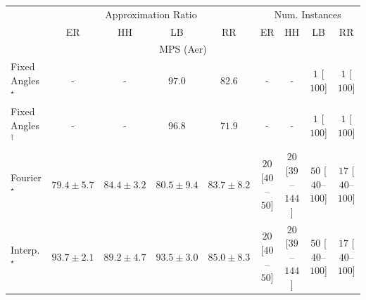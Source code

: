 \begin{tabular}{l|cccc|cccc|}
\toprule
& \multicolumn{4}{c|}{Approximation Ratio} & \multicolumn{4}{c|}{Num. Instances} \\
            & ER & HH & LB & RR & ER & HH & LB & RR \\
\midrule
\multicolumn{9}{c}{\rule{0pt}{8pt}MPS (Aer)} \\
\midrule
Fixed Angles$^\star$ & {\cellcolor[HTML]{000000}} \color[HTML]{F1F1F1} {\cellcolor{white}} \color{black} - & {\cellcolor[HTML]{000000}} \color[HTML]{F1F1F1} {\cellcolor{white}} \color{black} - & {\cellcolor[HTML]{50014E}} \color[HTML]{F1F1F1} $97.0$ & {\cellcolor[HTML]{8B5CAA}} \color[HTML]{F1F1F1} $82.6$ & {\cellcolor[HTML]{000000}} \color[HTML]{F1F1F1} {\cellcolor{white}} \color{black} - & {\cellcolor[HTML]{000000}} \color[HTML]{F1F1F1} {\cellcolor{white}} \color{black} - & {\cellcolor[HTML]{FFF7F3}} \color[HTML]{000000} $1$ [$100$] & {\cellcolor[HTML]{FFF7F3}} \color[HTML]{000000} $1$ [$100$] \\
Fixed Angles$^\dagger$ & {\cellcolor[HTML]{000000}} \color[HTML]{F1F1F1} {\cellcolor{white}} \color{black} - & {\cellcolor[HTML]{000000}} \color[HTML]{F1F1F1} {\cellcolor{white}} \color{black} - & {\cellcolor[HTML]{520150}} \color[HTML]{F1F1F1} $96.8$ & {\cellcolor[HTML]{95AAD0}} \color[HTML]{F1F1F1} $71.9$ & {\cellcolor[HTML]{000000}} \color[HTML]{F1F1F1} {\cellcolor{white}} \color{black} - & {\cellcolor[HTML]{000000}} \color[HTML]{F1F1F1} {\cellcolor{white}} \color{black} - & {\cellcolor[HTML]{FFF7F3}} \color[HTML]{000000} $1$ [$100$] & {\cellcolor[HTML]{FFF7F3}} \color[HTML]{000000} $1$ [$100$] \\
Fourier$^\star$ & {\cellcolor[HTML]{8C74B5}} \color[HTML]{F1F1F1} $79.4\pm 5.7$ & {\cellcolor[HTML]{894DA3}} \color[HTML]{F1F1F1} $84.4\pm 3.2$ & {\cellcolor[HTML]{8C6AB1}} \color[HTML]{F1F1F1} $80.5\pm 9.4$ & {\cellcolor[HTML]{8A52A5}} \color[HTML]{F1F1F1} $83.7\pm 8.2$ & {\cellcolor[HTML]{FFF3EF}} \color[HTML]{000000} $20$ [$40$--$50$] & {\cellcolor[HTML]{FFF3EF}} \color[HTML]{000000} $20$ [$39$--$144$] & {\cellcolor[HTML]{FEEBE8}} \color[HTML]{000000} $50$ [$40$--$100$] & {\cellcolor[HTML]{FFF3F0}} \color[HTML]{000000} $17$ [$40$--$100$] \\
Interp.$^\star$ & {\cellcolor[HTML]{6F0A6B}} \color[HTML]{F1F1F1} $93.7\pm 2.1$ & {\cellcolor[HTML]{84258B}} \color[HTML]{F1F1F1} $89.2\pm 4.7$ & {\cellcolor[HTML]{710A6D}} \color[HTML]{F1F1F1} $93.5\pm 3.0$ & {\cellcolor[HTML]{8949A1}} \color[HTML]{F1F1F1} $85.0\pm 8.3$ & {\cellcolor[HTML]{FFF3EF}} \color[HTML]{000000} $20$ [$40$--$50$] & {\cellcolor[HTML]{FFF3EF}} \color[HTML]{000000} $20$ [$39$--$144$] & {\cellcolor[HTML]{FEEBE8}} \color[HTML]{000000} $50$ [$40$--$100$] & {\cellcolor[HTML]{FFF3F0}} \color[HTML]{000000} $17$ [$40$--$100$] \\

\end{tabular}
